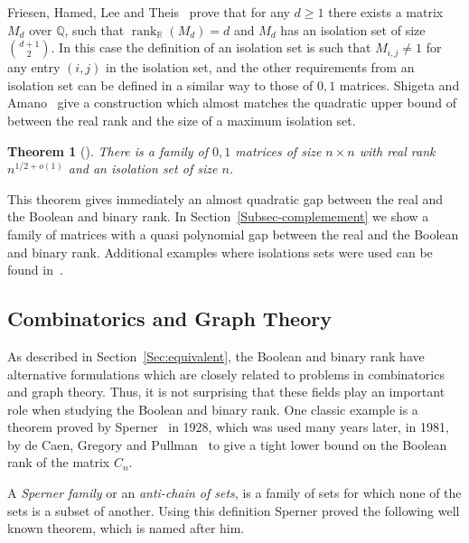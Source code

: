 \documentclass[11pt]{article}
\newtheorem{theorem}{Theorem}
\def\Q{\mathbb{Q}}
\newcommand{\rank}{\mathop{\mathrm{rank}}}
\newcommand{\Rreal}{{\rank}_\mathbb{R}}
\begin{document}
Friesen, Hamed,  Lee and Theis~\cite{friesen2015fooling} prove that for any $d \geq 1$ there exists a matrix $M_d$ over $\Q$,
such that $\Rreal(M_d) = d$ and $M_d$ has an isolation set of size $\binom{d+1}{2}$.
In this case the definition of an isolation set is such that $M_{i,j} \neq 1$ for any entry $(i,j)$ in the isolation set,
and the other requirements from an isolation set can be defined in a similar way to those of $0,1$ matrices.
Shigeta and  Amano~\cite{shigeta2015ordered} give a construction which almost matches the quadratic upper bound of~\cite{dietzfelbinger1996comparison}
between the real rank and the size of a maximum isolation set.

\begin{theorem}[\cite{shigeta2015ordered}]
There is a family of  $0,1$ matrices of size $n \times n$ with real rank $n^{1/2 + o(1)}$ and an isolation set of size $n$.
\end{theorem}

This theorem gives immediately an almost quadratic  gap between the real and the Boolean and binary  rank.
In Section~\ref{Subsec-complemement} we show a family of matrices with a quasi polynomial gap between the real and the Boolean and binary rank.
Additional examples where isolations sets were used can be found in~\cite{beasley2012isolation, de1988boolean, haviv2022upper, HefnerHLM90, watson2016nonnegative}.


\subsection{Combinatorics and Graph Theory}
\label{Subsec-combinatorics}
As described in Section~\ref{Sec:equivalent}, the Boolean and binary rank have alternative formulations which are closely related to problems in combinatorics and graph theory.
Thus, it is not surprising that these fields play an important role when studying the Boolean and binary rank.
One classic example is a theorem proved by Sperner~\cite{sperner1928satz} in 1928,
which was used many years later, in 1981, by de Caen, Gregory and Pullman~\cite{Caen2} to give a tight lower bound on the Boolean rank of the matrix $C_n$.

A {\em Sperner family} or an {\em anti-chain of sets}, is a family of sets for which none of the sets is a subset of another.
Using this definition Sperner proved the following well known theorem, which is named after him.
\end{document}
